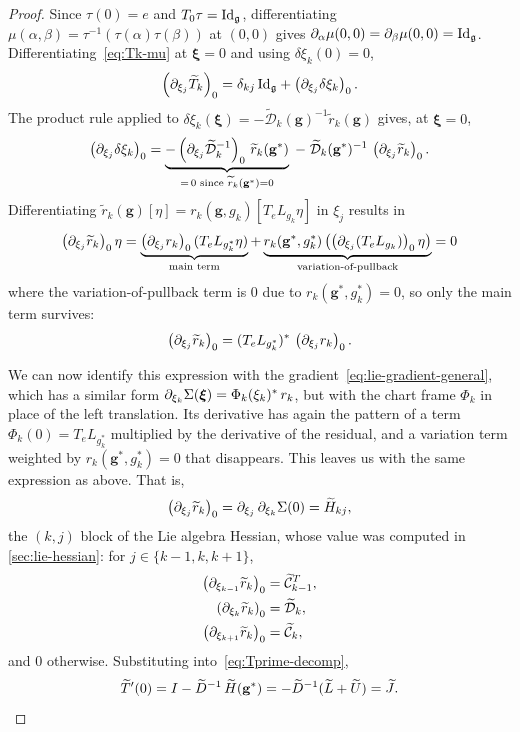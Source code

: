 \begin{proof}
	Since $\tau(0) = e$ and $T_0\tau = \mathrm{Id}_{\mathfrak{g}}$, differentiating $\mu(\alpha,\beta) = \tau^{-1}(\tau(\alpha)\tau(\beta))$ at $(0,0)$ gives $\pdv{\mu}!{\alpha}(0, 0) = \pdv{\mu}!{\beta}(0, 0) = \mathrm{Id}_{\mathfrak{g}}$.
	Differentiating~\eqref{eq:Tk-mu} at $\boldsymbol \xi = 0$ and using $\delta \xi_k(0) = 0$,
	\begin{equation}
		\pdv{\widetilde{T}_k}!{\xi_j}_0 = \delta_{kj}\, \mathrm{Id}_{\mathfrak{g}} + \pdv{\delta \xi_k}!{\xi_j}_0.
		\label{eq:Tprime-decomp}
	\end{equation}
	The product rule applied to $\delta \xi_k(\boldsymbol \xi) = -\widetilde{\mathcal{D}}_k(\mathbf{g})^{-1} \widetilde{r}_k(\mathbf{g})$ gives, at $\boldsymbol \xi = 0$,
	\[
		\pdv{\delta \xi_k}!{\xi_j}_0
		= \underbrace{-\pdv{\widetilde{\mathcal{D}}_k^{-1}}!{\xi_j}_0\, \widetilde{r}_k(\mathbf{g}^*)}_{=\, 0\text{ since } \widetilde{r}_k(\mathbf{g}^*) = 0}
		\;-\; \widetilde{\mathcal{D}}_k(\mathbf{g}^*)^{-1}\, \pdv{\widetilde{r}_k}!{\xi_j}_0.
	\]
	Differentiating $\widetilde{r}_k(\mathbf{g})[\eta] = r_k(\mathbf{g}, g_k)[T_e L_{g_k} \eta]$ in $\xi_j$ results in
	\[
		\pdv{\widetilde{r}_k}!{\xi_j}_0 \eta =
		\underbrace{\pdv{r_k}!{\xi_j}_0(T_e L_{g_k^*}\eta)}_\text{main term} +
		\underbrace{r_k(\mathbf{g}^*, g_k^*) \left(\pdv{(T_e L_{g_k})}!{\xi_j}_0 \eta\right)}_\text{variation-of-pullback} = 0
	\]
	where the variation-of-pullback term is $0$ due to $r_k(\mathbf{g}^*, g_k^*) = 0$, so only the main term survives:
	\[
		\pdv{\widetilde{r}_k}!{\xi_j}_0 = (T_e L_{g_k^*})^*\, \pdv{r_k}!{\xi_j}_0.
	\]

	We can now identify this expression with the gradient~\eqref{eq:lie-gradient-general}, which has a similar form $\pdv{\Sigma}!{\xi_k}(\boldsymbol\xi) = \Phi_k(\xi_k)^*\, r_k$, but with the chart frame $\Phi_k$ in place of the left translation. Its derivative has again the pattern of a term $\Phi_k(0) = T_e L_{g_k^*}$ multiplied by the derivative of the residual, and a variation term weighted by $r_k(\mathbf{g}^*, g_k^*) = 0$ that disappears. This leaves us with the same expression as above. That is,
	\[
		\pdv{\widetilde{r}_k}!{\xi_j}_0 = \pdv{\Sigma}!{\xi_j, \xi_k}(0) = \widetilde{H}_{kj},
	\]
	the $(k,j)$ block of the Lie algebra Hessian, whose value was computed in \cref{sec:lie-hessian}: for $j \in \{k-1, k, k+1\}$,
	\begin{align*}
		\pdv{\widetilde{r}_k}!{\xi_{k-1}}_0 & = \widetilde{\mathcal{C}}_{k-1}^T, \\
		\pdv{\widetilde{r}_k}!{\xi_k}_0     & = \widetilde{\mathcal{D}}_k,       \\
		\pdv{\widetilde{r}_k}!{\xi_{k+1}}_0 & = \widetilde{\mathcal{C}}_k,
	\end{align*}
	and $0$ otherwise.
	Substituting into~\eqref{eq:Tprime-decomp},
	\[
		\widetilde{T}'(0) = I - \widetilde{D}^{-1}\, \widetilde{H}(\mathbf{g}^*) = -\widetilde{D}^{-1}(\widetilde{L} + \widetilde{U}) = \widetilde{J}. \qedhere
	\]
\end{proof}

